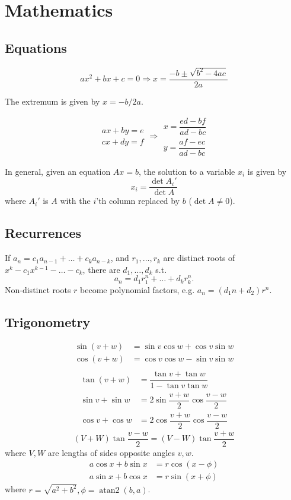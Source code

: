 
\chapter{Mathematics}

\section{Equations}
\[ax^2+bx+c=0 \Rightarrow x = \frac{-b\pm\sqrt{b^2-4ac}}{2a}\]

The extremum is given by $x = -b/2a$.

\[\begin{aligned}ax+by=e\\cx+dy=f\end{aligned}
\Rightarrow
\begin{aligned}x=\dfrac{ed-bf}{ad-bc}\\y=\dfrac{af-ec}{ad-bc}\end{aligned}\]

In general, given an equation $Ax = b$, the solution to a variable $x_i$ is given by
\[x_i = \frac{\det A_i'}{\det A} \]
where $A_i'$ is $A$ with the $i$'th column replaced by $b$ ($\det A\neq0$).

\section{Recurrences}
If $a_n = c_1 a_{n-1} + \dots + c_k a_{n-k}$, and $r_1, \dots, r_k$ are distinct roots of $x^k - c_1 x^{k-1} - \dots - c_k$, there are $d_1, \dots, d_k$ s.t.
\[a_n = d_1r_1^n + \dots + d_kr_k^n. \]
Non-distinct roots $r$ become polynomial factors, e.g. $a_n = (d_1n + d_2)r^n$.

\section{Trigonometry}
\begin{align*}
\sin(v+w)&{}=\sin v\cos w+\cos v\sin w\\
\cos(v+w)&{}=\cos v\cos w-\sin v\sin w\\
\end{align*}
\begin{align*}
\tan(v+w)&{}=\dfrac{\tan v+\tan w}{1-\tan v\tan w}\\
\sin v+\sin w&{}=2\sin\dfrac{v+w}{2}\cos\dfrac{v-w}{2}\\
\cos v+\cos w&{}=2\cos\dfrac{v+w}{2}\cos\dfrac{v-w}{2}
\end{align*}
\[ (V+W)\tan\frac{v-w}{2}=(V-W)\tan\frac{v+w}{2} \]
where $V, W$ are lengths of sides opposite angles $v, w$.
\begin{align*}
	a\cos x+b\sin x&=r\cos(x-\phi)\\
	a\sin x+b\cos x&=r\sin(x+\phi)
\end{align*}
where $r=\sqrt{a^2+b^2}, \phi=\operatorname{atan2}(b,a)$.

